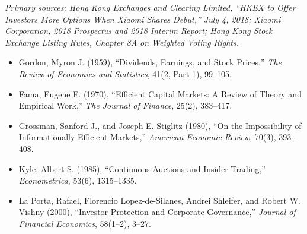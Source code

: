 \emph{Primary sources: Hong Kong Exchanges and Clearing Limited, ``HKEX to Offer Investors More Options When Xiaomi Shares Debut,'' July 4, 2018; Xiaomi Corporation, 2018 Prospectus and 2018 Interim Report; Hong Kong Stock Exchange Listing Rules, Chapter 8A on Weighted Voting Rights.}



\begin{itemize}

\item Gordon, Myron J. (1959),
``Dividends, Earnings, and Stock Prices,''
\emph{The Review of Economics and Statistics}, 41(2, Part 1), 99--105.

\item Fama, Eugene F. (1970),
``Efficient Capital Markets: A Review of Theory and Empirical Work,''
\emph{The Journal of Finance}, 25(2), 383--417.

\item Grossman, Sanford J., and Joseph E. Stiglitz (1980),
``On the Impossibility of Informationally Efficient Markets,''
\emph{American Economic Review}, 70(3), 393--408.

\item Kyle, Albert S. (1985),
``Continuous Auctions and Insider Trading,''
\emph{Econometrica}, 53(6), 1315--1335.

\item La Porta, Rafael, Florencio Lopez-de-Silanes, Andrei Shleifer, and Robert W. Vishny (2000),
``Investor Protection and Corporate Governance,''
\emph{Journal of Financial Economics}, 58(1--2), 3--27.

\end{itemize}

